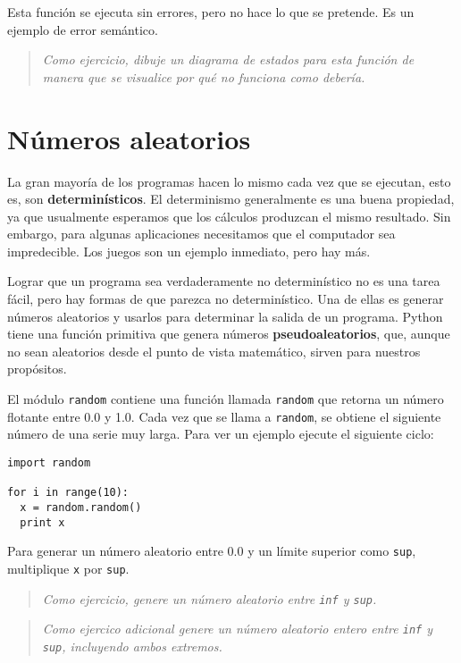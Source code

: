 Esta función se ejecuta sin errores, pero no hace lo que se pretende.
Es un ejemplo de error semántico.


\begin{quote}
{\em Como ejercicio, dibuje un diagrama de estados para esta función de 
manera que se visualice por qué no funciona como debería.}
\end{quote}


\section{Números aleatorios}

La gran mayoría de los programas hacen lo mismo cada vez que se ejecutan,
esto es, son  {\bf determinísticos}.  El determinismo generalmente es 
una buena propiedad, ya que usualmente esperamos que los cálculos
produzcan el mismo resultado. Sin embargo, para algunas aplicaciones
necesitamos que el computador sea impredecible. Los juegos son un 
ejemplo inmediato, pero hay más.

Lograr que un programa sea verdaderamente no determinístico no es una
tarea fácil, pero hay formas de que parezca no determinístico. Una
de ellas es generar números aleatorios y usarlos para determinar
la salida de un programa. Python tiene una función primitiva
que genera números {\bf pseudoaleatorios}, que, aunque no sean
aleatorios desde el punto de vista matemático, sirven para nuestros
propósitos.

El módulo  \texttt{random} contiene una función llamada \texttt{random} que
retorna un número flotante entre 0.0 y 1.0.  Cada vez que se llama a
\texttt{random}, se obtiene el siguiente número de una serie muy larga.
Para ver un ejemplo ejecute el siguiente ciclo:

\beforeverb
\begin{verbatim}
import random

for i in range(10):
  x = random.random()
  print x
\end{verbatim}
\afterverb
%
Para generar un número aleatorio entre 0.0 y un límite superior
como \texttt{sup}, multiplique \texttt{x} por \texttt{sup}.

\begin{quote}
{\em Como ejercicio, genere un número aleatorio entre \texttt{inf} y
\texttt{sup}.}
\end{quote}

\begin{quote}
{\em Como ejercico adicional genere un número aleatorio {\em entero}
entre \texttt{inf} y  \texttt{sup}, incluyendo ambos extremos.}
\end{quote}


